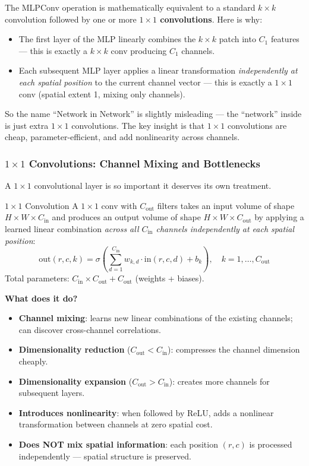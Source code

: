 \documentclass[11pt,a4paper]{article}
\begin{document}
\begin{insightbox}[MLPConv $=$ Conv + $1\times1$ Conv]
The MLPConv operation is mathematically equivalent to a standard $k\times k$ convolution followed by one or more \textbf{$1\times1$ convolutions}.  Here is why:
\begin{itemize}
  \item The first layer of the MLP linearly combines the $k\times k$ patch into $C_1$ features — this is exactly a $k\times k$ conv producing $C_1$ channels.
  \item Each subsequent MLP layer applies a linear transformation \emph{independently at each spatial position} to the current channel vector — this is exactly a $1\times1$ conv (spatial extent 1, mixing only channels).
\end{itemize}
So the name ``Network in Network'' is slightly misleading — the ``network'' inside is just extra $1\times1$ convolutions.  The key insight is that $1\times1$ convolutions are cheap, parameter-efficient, and add nonlinearity across channels.
\end{insightbox}

\subsubsection{$1\times1$ Convolutions: Channel Mixing and Bottlenecks}

A $1\times1$ convolutional layer is so important it deserves its own treatment.

\begin{defbox}{$1\times1$ Convolution}
A $1\times1$ conv with $C_\text{out}$ filters takes an input volume of shape $H\times W\times C_\text{in}$ and produces an output volume of shape $H\times W\times C_\text{out}$ by applying a learned linear combination \emph{across all $C_\text{in}$ channels independently at each spatial position}:
\[
\text{out}(r,c,k) = \sigma\!\left(\sum_{d=1}^{C_\text{in}} w_{k,d}\cdot\text{in}(r,c,d) + b_k\right), \quad k=1,\ldots,C_\text{out}
\]
Total parameters: $C_\text{in}\times C_\text{out} + C_\text{out}$ (weights + biases).
\end{defbox}

\textbf{What does it do?}
\begin{itemize}
  \item \textbf{Channel mixing}: learns new linear combinations of the existing channels; can discover cross-channel correlations.
  \item \textbf{Dimensionality reduction} ($C_\text{out} < C_\text{in}$): compresses the channel dimension cheaply.
  \item \textbf{Dimensionality expansion} ($C_\text{out} > C_\text{in}$): creates more channels for subsequent layers.
  \item \textbf{Introduces nonlinearity}: when followed by ReLU, adds a nonlinear transformation between channels at zero spatial cost.
  \item \textbf{Does NOT mix spatial information}: each position $(r,c)$ is processed independently — spatial structure is preserved.
\end{itemize}
\end{document}
